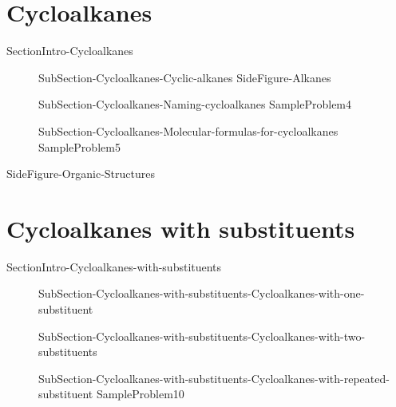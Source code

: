 \documentclass[main.tex]{subfiles}
\newcommand\chapterlabel{Ch-orgo}\setcounter{figurenewcounter}{0}\setcounter{tablenewcounter}{0}\setcounter{formulanewcounter}{0}
\begin{document}
\section{Cycloalkanes}{SectionIntro-Cycloalkanes}
\sloppy\begin{description}
\item[] {SubSection-Cycloalkanes-Cyclic-alkanes}
{SideFigure-Alkanes}
\item[]{SubSection-Cycloalkanes-Naming-cycloalkanes}
{SampleProblem4}
\item[]{SubSection-Cycloalkanes-Molecular-formulas-for-cycloalkanes}
{SampleProblem5}
\end{description}

{SideFigure-Organic-Structures}
\section{Cycloalkanes with substituents}{SectionIntro-Cycloalkanes-with-substituents}
\sloppy
\begin{description}
\item[]{SubSection-Cycloalkanes-with-substituents-Cycloalkanes-with-one-substituent}
\item[] {SubSection-Cycloalkanes-with-substituents-Cycloalkanes-with-two-substituents}
\item[]{SubSection-Cycloalkanes-with-substituents-Cycloalkanes-with-repeated-substituent}
{SampleProblem10}
\end{description}
\end{document}
